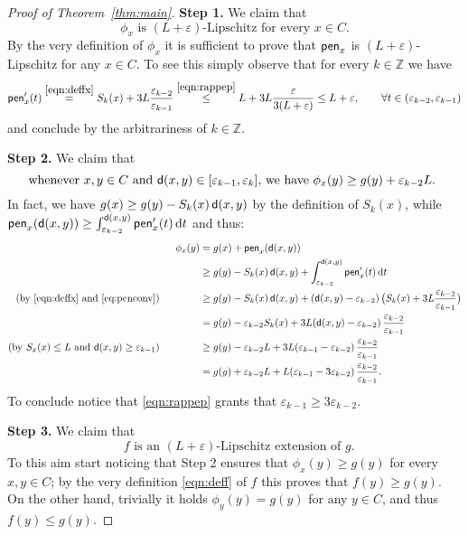 \documentclass[9pt,reqno]{amsart}
\renewcommand{\d}{{\rm d}}
\newcommand{\sfd}{{\sf d}}
\newcommand{\f}{{\sf pen}}
\def\ep{\varepsilon}
\begin{document}
\begin{proof}[Proof of Theorem~\ref{thm:main}]
\noindent\textbf{Step 1.} We claim that
\begin{equation}
\label{eq:claim1}
\text{$\phi_x$ is $(L+\ep)$-Lipschitz for every $x\in C$.}
\end{equation}
By the very definition of $\phi_x$ it is sufficient to prove that   $\f_x$ is $(L+\ep)$-Lipschitz for any $x\in C$. To see this simply observe that for every $k\in \mathbb{Z}$ we have
\[
\f'_x(t) \stackrel{\eqref{eqn:deffx}}= S_k(x) + 3 L \frac{ \ep_{k-2}}{\ep_{k-1}} \stackrel{\eqref{eqn:rappep}}\leq L + 3 L  \frac {\ep}{ 3(L+\ep)} \leq L+ \ep, \qquad \forall t \in (\ep_{k-2}, \ep_{k-1})
\]
and  conclude by the arbitrariness  of $k \in \mathbb{Z}$.


\vspace{10pt}



\noindent\textbf{Step 2.} We claim that
\begin{equation}
\label{eq:claim2}
\text{whenever $x,y \in C$ and  $\sfd(x,y) \in [\ep_{k-1}, \ep_{k}]$, we have $\phi_x(y) \geq g(y) + \ep_{k-2} L$. }
\end{equation}
In fact, we have $g(x) \geq g(y)- S_k(x) \, \sfd(x,y)$ by the definition of $S_k(x)$, while  $\f_x(\sfd(x,y)) \geq \int_{\ep_{k-2}}^{\sfd(x,y)} \f'_x(t)\, \d t$ and thus:
\begin{align*}
\phi_x(y)& =g(x) + \f_x(\sfd(x,y)) \\
&\geq g(y)- S_k(x) \, \sfd(x,y)+ \int_{\ep_{k-2}}^{\sfd(x,y)} \f'_x(t)\, \d t  \\
 (\text{by }\eqref{eqn:deffx} \text{ and }\eqref{eq:penconv})\qquad\qquad&\geq  g(y) - S_k(x) \, \sfd(x,y) +  (\sfd(x,y) - \ep_{k-2}) \, \big(S_k(x) + 3 L \frac{ \ep_{k-2}}{\ep_{k-1}}\big) \\
 & = g(y) - \ep_{k-2} S_k(x) + 3L (\sfd(x,y) - \ep_{k-2}) \, \frac{ \ep_{k-2}}{\ep_{k-1}} \\
(\text{by }S_x(x)\leq L\text{ and }\sfd(x,y)\geq \ep_{k-1})\qquad\qquad & \geq  g(y) - \ep_{k-2} L + 3L (\ep_{k-1} - \ep_{k-2}) \, \frac{ \ep_{k-2}}{\ep_{k-1}}  \\
 &=  g(y) + \ep_{k-2} L + L (\ep_{k-1} - 3\ep_{k-2}) \, \frac{ \ep_{k-2}}{\ep_{k-1}}.
\end{align*}
To conclude notice that  \eqref{eqn:rappep} grants that $\ep_{k-1} \geq 3\ep_{k-2}$.

\vspace{10pt}


\noindent \textbf{Step 3.} We claim that 
\begin{equation}
\label{eq:claim3}
\text{ $f$ is an $(L+\ep)$-Lipschitz extension of $g$.}
\end{equation}
To this aim start noticing that  Step 2 ensures that  $\phi_x(y) \geq g(y)$ for every $x,y \in C$; by the very definition \eqref{eqn:deff} of $f$ this proves that $f(y) \geq g(y)$. On the other hand, trivially it holds $\phi_y(y)=g(y)$ for any $y\in C$, and thus  $f(y) \leq g(y)$. 


\end{proof}
\end{document}
